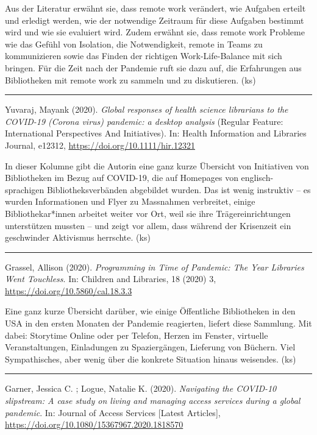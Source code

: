 \documentclass[a4paper,
fontsize=11pt,
oneside,
numbers=noperiodatend,
parskip=half-,
bibliography=totoc,
final
]{scrartcl}
\begin{document}
Aus der Literatur erwähnt sie, dass remote work verändert, wie Aufgaben
erteilt und erledigt werden, wie der notwendige Zeitraum für diese
Aufgaben bestimmt wird und wie sie evaluiert wird. Zudem erwähnt sie,
dass remote work Probleme wie das Gefühl von Isolation, die
Notwendigkeit, remote in Teams zu kommunizieren sowie das Finden der
richtigen Work-Life-Balance mit sich bringen. Für die Zeit nach der
Pandemie ruft sie dazu auf, die Erfahrungen aus Bibliotheken mit remote
work zu sammeln und zu diskutieren. (ks)

\begin{center}\rule{0.5\linewidth}{0.5pt}\end{center}

Yuvaraj, Mayank (2020). \emph{Global responses of health science
librarians to the COVID-19 (Corona virus) pandemic: a desktop analysis}
(Regular Feature: International Perspectives And Initiatives). In:
Health Information and Libraries Journal, e12312,
\url{https://doi.org/10.1111/hir.12321}

In dieser Kolumne gibt die Autorin eine ganz kurze Übersicht von
Initiativen von Bibliotheken im Bezug auf COVID-19, die auf Homepages
von englisch-sprachigen Bibliotheksverbänden abgebildet wurden. Das ist
wenig instruktiv -- es wurden Informationen und Flyer zu Massnahmen
verbreitet, einige Bibliothekar*innen arbeitet weiter vor Ort, weil sie
ihre Trägereinrichtungen unterstützen mussten -- und zeigt vor allem,
dass während der Krisenzeit ein geschwinder Aktivismus herrschte. (ks)

\begin{center}\rule{0.5\linewidth}{0.5pt}\end{center}

Grassel, Allison (2020). \emph{Programming in Time of Pandemic: The Year
Libraries Went Touchless}. In: Children and Libraries, 18 (2020) 3,
\url{https://doi.org/10.5860/cal.18.3.3}

Eine ganz kurze Übersicht darüber, wie einige Öffentliche Bibliotheken
in den USA in den ersten Monaten der Pandemie reagierten, liefert diese
Sammlung. Mit dabei: Storytime Online oder per Telefon, Herzen im
Fenster, virtuelle Veranstaltungen, Einladungen zu Spaziergängen,
Lieferung von Büchern. Viel Sympathisches, aber wenig über die konkrete
Situation hinaus weisendes. (ks)

\begin{center}\rule{0.5\linewidth}{0.5pt}\end{center}

Garner, Jessica C. ; Logue, Natalie K. (2020). \emph{Navigating the
COVID-10 slipstream: A case study on living and managing access services
during a global pandemic}. In: Journal of Access Services {[}Latest
Articles{]}, \url{https://doi.org/10.1080/15367967.2020.1818570}
\end{document}
